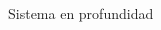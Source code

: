 \documentclass[]{beamer}
\begin{document}
\begin{frame}[fragile]{Sistema en profundidad}
\begin{columns}
        \begin{column}{5cm}
\end{column}
\end{columns}
\end{frame}
\end{document}
